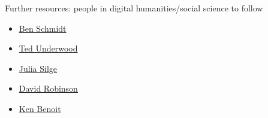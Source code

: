 \documentclass[t]{beamer}
\begin{document}
\begin{frame}{Further resources: people in digital humanities/social science to follow}
    \begin{itemize}
        \item \hyperlink{https://benschmidt.org/}{Ben Schmidt}
        \item \hyperlink{https://tedunderwood.com/}{Ted Underwood}
        \item \hyperlink{https://juliasilge.com/}{Julia Silge}
        \item \hyperlink{http://varianceexplained.org/}{David Robinson}
        \item \hyperlink{https://kenbenoit.net/}{Ken Benoit}
    \end{itemize}
\end{frame}
\end{document}
